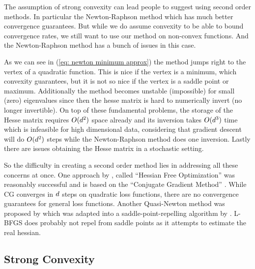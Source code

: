 The assumption of strong convexity can lead people to suggest using second order
methods. In particular the Newton-Raphson method which has much better convergence
guarantees. But while we do assume convexity to be able to bound convergence
rates, we still want to use our method on non-convex functions. And the
Newton-Raphson method has a bunch of issues in this case.

As we can see in (\ref{eq: newton minimum approx}) the method jumps right to the
vertex of a quadratic function. This is nice if the vertex is a minimum,
which convexity guarantees, but it is not so nice if the vertex is a saddle point
or maximum. Additionally the method becomes unstable (impossible) for small 
(zero) eigenvalues since then the hesse matrix is hard to numerically invert (no
longer invertible).
On top of these fundamental problems, the storage of the Hesse matrix requires
\(O(d^2)\) space already and its inversion takes \(O(d^3)\)
time which is infeasible for high dimensional data, considering that gradient
descent will do \(O(d^2)\) steps while the Newton-Raphson method does
one inversion. Lastly there are issues obtaining the Hesse matrix in a stochastic
setting.

So the difficulty in creating a second order method lies in addressing all these
concerns at once. One approach by \textcite{martensDeepLearningHessianfree2010},
called ``Hessian Free Optimization'' was reasonably successful and is based on
the ``Conjugate Gradient Method'' \parencite[for an introduction see
e.g.][]{shewchukIntroductionConjugateGradient1994}.
While CG converges in \(d\) steps on quadratic loss functions, there
are no convergence guarantees for general loss functions. Another Quasi-Newton
method was proposed by \textcite{vinyalsKrylovSubspaceDescent2012} which was
adapted into a saddle-point-repelling algorithm by
\textcite{dauphinIdentifyingAttackingSaddle2014}. L-BFGS
\parencite[e.g.][]{haghighiNumericalOptimizationUnderstanding2014} does probably
not repel from saddle points as it attempts to estimate the real hessian.

\subsection{Strong Convexity}

